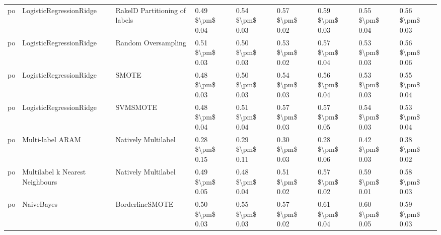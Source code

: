 \begin{tabular}{lllllllll}
      po &         LogisticRegressionRidge & RakelD Partitioning of labels & 0.49 \$\textbackslash pm\$ 0.04 &           0.54 \$\textbackslash pm\$ 0.03 &       0.57 \$\textbackslash pm\$ 0.02 &        0.59 \$\textbackslash pm\$ 0.03 &                         0.55 \$\textbackslash pm\$ 0.04 &     0.56 \$\textbackslash pm\$ 0.03 \\
      po &         LogisticRegressionRidge &           Random Oversampling & 0.51 \$\textbackslash pm\$ 0.03 &           0.50 \$\textbackslash pm\$ 0.03 &       0.53 \$\textbackslash pm\$ 0.02 &        0.57 \$\textbackslash pm\$ 0.04 &                         0.53 \$\textbackslash pm\$ 0.03 &     0.56 \$\textbackslash pm\$ 0.06 \\
      po &         LogisticRegressionRidge &                         SMOTE & 0.48 \$\textbackslash pm\$ 0.03 &           0.50 \$\textbackslash pm\$ 0.03 &       0.54 \$\textbackslash pm\$ 0.03 &        0.56 \$\textbackslash pm\$ 0.04 &                         0.53 \$\textbackslash pm\$ 0.03 &     0.55 \$\textbackslash pm\$ 0.04 \\
      po &         LogisticRegressionRidge &                      SVMSMOTE & 0.48 \$\textbackslash pm\$ 0.04 &           0.51 \$\textbackslash pm\$ 0.04 &       0.57 \$\textbackslash pm\$ 0.03 &        0.57 \$\textbackslash pm\$ 0.05 &                         0.54 \$\textbackslash pm\$ 0.03 &     0.53 \$\textbackslash pm\$ 0.04 \\
      po &                Multi-label ARAM &           Natively Multilabel & 0.28 \$\textbackslash pm\$ 0.15 &           0.29 \$\textbackslash pm\$ 0.11 &       0.30 \$\textbackslash pm\$ 0.03 &        0.28 \$\textbackslash pm\$ 0.06 &                         0.42 \$\textbackslash pm\$ 0.03 &     0.38 \$\textbackslash pm\$ 0.02 \\
      po & Multilabel k Nearest Neighbours &           Natively Multilabel & 0.49 \$\textbackslash pm\$ 0.05 &           0.48 \$\textbackslash pm\$ 0.04 &       0.51 \$\textbackslash pm\$ 0.02 &        0.57 \$\textbackslash pm\$ 0.02 &                         0.59 \$\textbackslash pm\$ 0.01 &     0.58 \$\textbackslash pm\$ 0.03 \\
      po &                      NaiveBayes &               BorderlineSMOTE & 0.50 \$\textbackslash pm\$ 0.03 &           0.55 \$\textbackslash pm\$ 0.03 &       0.57 \$\textbackslash pm\$ 0.02 &        0.61 \$\textbackslash pm\$ 0.04 &                         0.60 \$\textbackslash pm\$ 0.05 &     0.59 \$\textbackslash pm\$ 0.03 \\

\end{tabular}
